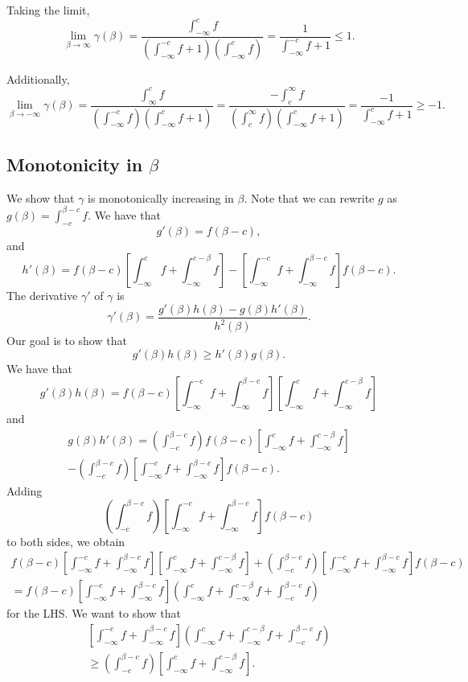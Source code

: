 \documentclass[12pt]{article}
\begin{document}
Taking the limit,
$$\lim_{\beta \to \infty} \gamma(\beta) = \frac{ \int_{-\infty}^{c} f} { \left( \int_{-\infty}^{-c} f + 1 \right)\left( \int_{-\infty}^c f \right) } = \frac{1}{ \int_{-\infty}^{-c} f + 1} \leq 1.$$

Additionally, 
$$\lim_{\beta \to -\infty} \gamma(\beta)  = \frac{ \int_{\infty}^c f }{ \left( \int_{-\infty}^{-c} f \right) \left( \int_{-\infty}^c f + 1 \right) } = \frac{ - \int_{c}^{\infty} f}{ \left( \int_{c}^\infty f \right) \left( \int_{-\infty}^c f + 1 \right)} = \frac{-1}{ \int_{-\infty}^c f + 1 } \geq -1.$$

\subsection{Monotonicity in $\beta$}
We show that $\gamma$ is monotonically increasing in $\beta$. Note that we can rewrite $g$ as $g(\beta) = \int_{-c}^{\beta - c} f.$ We have that
$$g'(\beta) = f(\beta - c),$$ and $$h'(\beta) = f(\beta - c) \left[ \int_{-\infty}^c f + \int_{-\infty}^{c - \beta} f \right] - \left[ \int_{-\infty}^{-c} f + \int_{-\infty}^{\beta - c} f \right]f(\beta - c).$$ The derivative $\gamma'$ of $\gamma$ is
$$ \gamma'( \beta )  = \frac{g'(\beta)h(\beta) - g(\beta)h'(\beta) }{ h^2(\beta)}.$$ Our goal is to show that
$$ g'(\beta)h(\beta) \geq h'(\beta) g(\beta).$$ We have that
$$ g'(\beta) h(\beta) = f(\beta-c) \left[ \int_{-\infty}^{-c} f + \int_{-\infty}^{\beta - c} f \right] \left[ \int_{-\infty}^c f + \int_{-\infty}^{c - \beta} f \right]$$ and 
\begin{multline*}
 g(\beta) h'(\beta) = \left(\int_{-c}^{\beta - c} f \right) f(\beta - c) \left[ \int_{-\infty}^c f + \int_{-\infty}^{c - \beta} f \right] \\ - \left(\int_{-c}^{\beta - c} f \right) \left[ \int_{-\infty}^{-c} f + \int_{-\infty}^{\beta - c} f \right]f(\beta - c).
 \end{multline*}
Adding $$\left(\int_{-c}^{\beta - c} f \right) \left[ \int_{-\infty}^{-c} f + \int_{-\infty}^{\beta - c} f \right]f(\beta - c)$$ to both sides, we obtain
\begin{multline}\label{beta_monotone_1}
f(\beta-c) \left[ \int_{-\infty}^{-c} f + \int_{-\infty}^{\beta - c} f \right] \left[ \int_{-\infty}^c f + \int_{-\infty}^{c - \beta} f \right] + \left(\int_{-c}^{\beta - c} f \right) \left[ \int_{-\infty}^{-c} f + \int_{-\infty}^{\beta - c} f \right]f(\beta - c) \\ = f(\beta - c) \left[ \int_{-\infty}^{-c} f + \int_{-\infty}^{\beta-c} f \right] \left( \int_{-\infty}^ c f + \int_{-\infty}^{c - \beta} f + \int_{-c}^{\beta - c} f \right)
\end{multline} for the LHS. We want to show that
\begin{multline}\label{beta_monotone_2}
\left[ \int_{-\infty}^{-c} f + \int_{-\infty}^{\beta-c} f \right] \left( \int_{-\infty}^ c f + \int_{-\infty}^{c - \beta} f + \int_{-c}^{\beta - c} f \right) \\\geq \left(\int_{-c}^{\beta - c} f \right) \left[ \int_{-\infty}^c f + \int_{-\infty}^{c - \beta} f \right].
\end{multline}
\end{document}
